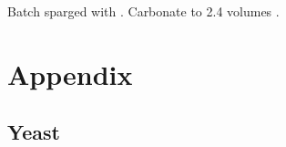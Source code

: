 \documentclass[10pt,oneside]{scrbook}
\begin{document}

\begin{methodandtiming}
 
\begin{mashsteps}
\end{mashsteps}

\begin{fermentationsteps}
\end{fermentationsteps}

\begin{directions}
Batch sparged with . Carbonate to 2.4 volumes .
\end{directions}

\end{methodandtiming}

\pagebreak

\begin{ingredientsblock}

\begin{malts}
\end{malts}

\begin{hops}
\end{hops}

\begin{yeasts}
\end{yeasts}

\begin{twists}
\end{twists}

\end{ingredientsblock}

\part{Appendix}

\chapter*{Yeast}
\end{document}
